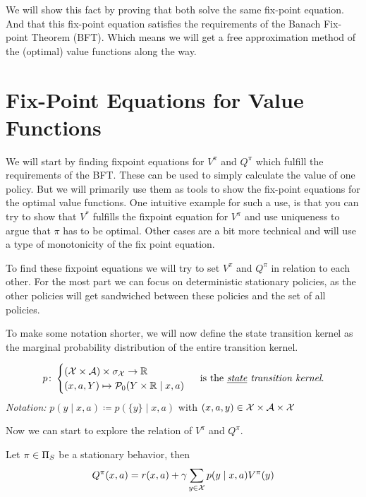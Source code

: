 We will show this fact by proving that both solve the same fix-point equation. And that this fix-point equation satisfies the requirements of the Banach Fix-point Theorem (BFT). Which means we will get a free approximation method of the (optimal) value functions along the way.

\section{Fix-Point Equations for Value Functions}
We will start by finding fixpoint equations for \(V^\pi\) and \(Q^\pi\) which fulfill the requirements of the BFT. These can be used to simply calculate the value of one policy. But we will primarily use them as tools to show the fix-point equations for the optimal value functions. One intuitive example for such a use, is that you can try to show that \(V^*\) fulfills the fixpoint equation for \(V^\pi\) and use uniqueness to argue that \(\pi\) has to be optimal. Other cases are a bit more technical and will use a type of monotonicity of the fix point equation.

To find these fixpoint equations we will try to set \(V^\pi\) and \(Q^\pi\) in relation to each other. For the most part we can focus on deterministic stationary policies, as the other policies will get sandwiched between these policies and the set of all policies.

To make some notation shorter, we will now define the state transition kernel as the marginal probability distribution of the entire transition kernel.

\begin{definition}
	\[
	p\colon 
	\begin{cases}
		(\mathcal{X}\times\mathcal{A})\times\sigma_{\mathcal{X}}\to\mathbb{R}\\
		(x,a,Y)\mapsto \mathcal{P}_0(Y\times\mathbb{R}\mid x,a)
	\end{cases}\text{ is the \emph{\underline{state} transition kernel}.}
	\] 
\emph{Notation:} \(p(y\mid x,a)\coloneqq p(\{y\}\mid x,a)\) with \((x,a,y)\in\mathcal{X}\times\mathcal{A}\times\mathcal{X}\)
\end{definition}

Now we can start to explore the relation of \(V^\pi\) and \(Q^\pi\).

\begin{prop}\label{expand Q^pi} Let \(\pi\in\Pi_S\) be a stationary behavior, then
	\[Q^\pi(x,a)=r(x,a)+\gamma\sum_{y\in\mathcal{X}}p(y\mid x,a)V^\pi(y)	\]
\end{prop}

